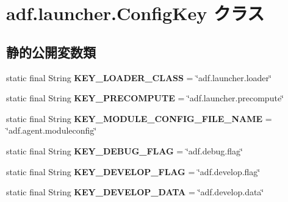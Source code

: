 \hypertarget{classadf_1_1launcher_1_1ConfigKey}{}\section{adf.\+launcher.\+Config\+Key クラス}
\label{classadf_1_1launcher_1_1ConfigKey}
\subsection*{静的公開変数類}
\begin{DoxyCompactItemize}
\item 
\hypertarget{classadf_1_1launcher_1_1ConfigKey_a8d68cfb5604916c75bb5c9ee358210d3}{}\label{classadf_1_1launcher_1_1ConfigKey_a8d68cfb5604916c75bb5c9ee358210d3} 
static final String {\bfseries K\+E\+Y\+\_\+\+L\+O\+A\+D\+E\+R\+\_\+\+C\+L\+A\+SS} = \char`\"{}adf.\+launcher.\+loader\char`\"{}
\item 
\hypertarget{classadf_1_1launcher_1_1ConfigKey_aeff8ee3a58dab2e14a806b1fe6ec2b46}{}\label{classadf_1_1launcher_1_1ConfigKey_aeff8ee3a58dab2e14a806b1fe6ec2b46} 
static final String {\bfseries K\+E\+Y\+\_\+\+P\+R\+E\+C\+O\+M\+P\+U\+TE} = \char`\"{}adf.\+launcher.\+precompute\char`\"{}
\item 
\hypertarget{classadf_1_1launcher_1_1ConfigKey_acce20feb471139f0348ad4866261b485}{}\label{classadf_1_1launcher_1_1ConfigKey_acce20feb471139f0348ad4866261b485} 
static final String {\bfseries K\+E\+Y\+\_\+\+M\+O\+D\+U\+L\+E\+\_\+\+C\+O\+N\+F\+I\+G\+\_\+\+F\+I\+L\+E\+\_\+\+N\+A\+ME} = \char`\"{}adf.\+agent.\+moduleconfig\char`\"{}
\item 
\hypertarget{classadf_1_1launcher_1_1ConfigKey_a448fe3a17e611cdb9d553fcb91c768ea}{}\label{classadf_1_1launcher_1_1ConfigKey_a448fe3a17e611cdb9d553fcb91c768ea} 
static final String {\bfseries K\+E\+Y\+\_\+\+D\+E\+B\+U\+G\+\_\+\+F\+L\+AG} = \char`\"{}adf.\+debug.\+flag\char`\"{}
\item 
\hypertarget{classadf_1_1launcher_1_1ConfigKey_a7a34844fe20b06d3ae3d7ee3717eccdb}{}\label{classadf_1_1launcher_1_1ConfigKey_a7a34844fe20b06d3ae3d7ee3717eccdb} 
static final String {\bfseries K\+E\+Y\+\_\+\+D\+E\+V\+E\+L\+O\+P\+\_\+\+F\+L\+AG} = \char`\"{}adf.\+develop.\+flag\char`\"{}
\item 
\hypertarget{classadf_1_1launcher_1_1ConfigKey_a766ab160d3b6cc5dfbbf194cc7964a81}{}\label{classadf_1_1launcher_1_1ConfigKey_a766ab160d3b6cc5dfbbf194cc7964a81} 
static final String {\bfseries K\+E\+Y\+\_\+\+D\+E\+V\+E\+L\+O\+P\+\_\+\+D\+A\+TA} = \char`\"{}adf.\+develop.\+data\char`\"{}

\end{DoxyCompactItemize}

